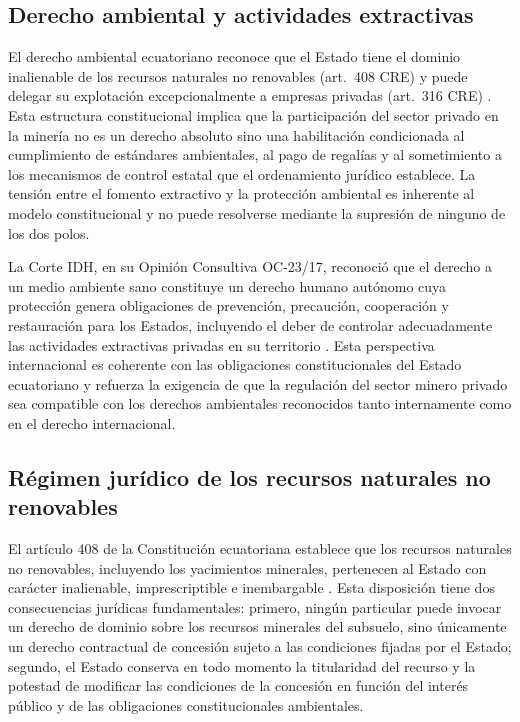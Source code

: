 \subsection{Derecho ambiental y actividades extractivas}

El derecho ambiental ecuatoriano reconoce que el Estado tiene el dominio inalienable de los recursos naturales no renovables (art.\ 408 CRE) y puede delegar su explotación excepcionalmente a empresas privadas (art.\ 316 CRE) \parencite{cre_2008}. Esta estructura constitucional implica que la participación del sector privado en la minería no es un derecho absoluto sino una habilitación condicionada al cumplimiento de estándares ambientales, al pago de regalías y al sometimiento a los mecanismos de control estatal que el ordenamiento jurídico establece. La tensión entre el fomento extractivo y la protección ambiental es inherente al modelo constitucional y no puede resolverse mediante la supresión de ninguno de los dos polos.

La Corte IDH, en su Opinión Consultiva OC-23/17, reconoció que el derecho a un medio ambiente sano constituye un derecho humano autónomo cuya protección genera obligaciones de prevención, precaución, cooperación y restauración para los Estados, incluyendo el deber de controlar adecuadamente las actividades extractivas privadas en su territorio \parencite{corte_idh_oc23_2017}. Esta perspectiva internacional es coherente con las obligaciones constitucionales del Estado ecuatoriano y refuerza la exigencia de que la regulación del sector minero privado sea compatible con los derechos ambientales reconocidos tanto internamente como en el derecho internacional.

\subsection{Régimen jurídico de los recursos naturales no renovables}

El artículo 408 de la Constitución ecuatoriana establece que los recursos naturales no renovables, incluyendo los yacimientos minerales, pertenecen al Estado con carácter inalienable, imprescriptible e inembargable \parencite{cre_2008}. Esta disposición tiene dos consecuencias jurídicas fundamentales: primero, ningún particular puede invocar un derecho de dominio sobre los recursos minerales del subsuelo, sino únicamente un derecho contractual de concesión sujeto a las condiciones fijadas por el Estado; segundo, el Estado conserva en todo momento la titularidad del recurso y la potestad de modificar las condiciones de la concesión en función del interés público y de las obligaciones constitucionales ambientales.

